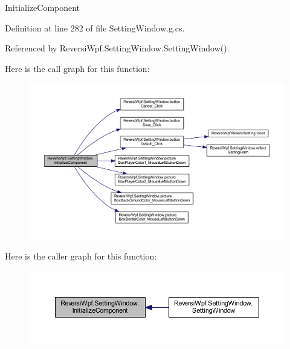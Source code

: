 Initialize\+Component 



Definition at line 282 of file Setting\+Window.\+g.\+cs.



Referenced by Reversi\+Wpf.\+Setting\+Window.\+Setting\+Window().

Here is the call graph for this function\+:
\nopagebreak
\begin{figure}[H]
\begin{center}
\leavevmode
\includegraphics[width=350pt]{class_reversi_wpf_1_1_setting_window_a34db1776e5f52338539888d97f317a5a_cgraph}
\end{center}
\end{figure}
Here is the caller graph for this function\+:\nopagebreak
\begin{figure}[H]
\begin{center}
\leavevmode
\includegraphics[width=350pt]{class_reversi_wpf_1_1_setting_window_a34db1776e5f52338539888d97f317a5a_icgraph}
\end{center}
\end{figure}
\mbox{\label{class_reversi_wpf_1_1_setting_window_a34db1776e5f52338539888d97f317a5a}} 
